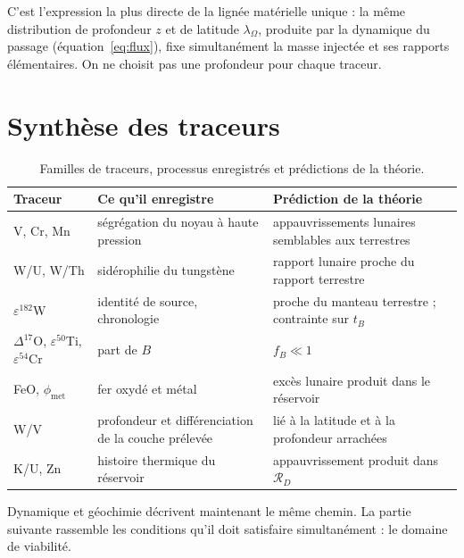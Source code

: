 \documentclass[11pt,a4paper,openany]{report}
\newcommand{\RD}{\mathcal{R}_{D}}
\begin{document}
\begin{ideephys}
C'est l'expression la plus directe de la lignée matérielle unique : la même distribution de
profondeur $z$ et de latitude $\lambda_\Omega$, produite par la dynamique du passage
(équation~\eqref{eq:flux}), fixe simultanément la masse injectée et ses rapports élémentaires. On ne
choisit pas une profondeur pour chaque traceur.
\end{ideephys}

\section{Synthèse des traceurs}

\begin{table}[htbp]
\centering
\small
\caption{Familles de traceurs, processus enregistrés et prédictions de la théorie.}
\label{tab:traceurs}
\begin{tabularx}{\textwidth}{>{\raggedright\arraybackslash}p{2.6cm}
>{\raggedright\arraybackslash}X >{\raggedright\arraybackslash}X}
\toprule
\textbf{Traceur} & \textbf{Ce qu'il enregistre} & \textbf{Prédiction de la théorie} \\
\midrule
V, Cr, Mn & ségrégation du noyau à haute pression & appauvrissements lunaires semblables aux terrestres \\
W/U, W/Th & sidérophilie du tungstène & rapport lunaire proche du rapport terrestre \\
$\varepsilon^{182}$W & identité de source, chronologie & proche du manteau terrestre ; contrainte sur $t_B$ \\
$\Delta^{17}$O, $\varepsilon^{50}$Ti, $\varepsilon^{54}$Cr & part de $B$ & $f_B\ll1$ \\
FeO, $\phi_{\mathrm{met}}$ & fer oxydé et métal & excès lunaire produit dans le réservoir \\
W/V & profondeur et différenciation de la couche prélevée & lié à la latitude et à la profondeur arrachées \\
K/U, Zn & histoire thermique du réservoir & appauvrissement produit dans $\RD$ \\
\bottomrule
\end{tabularx}
\end{table}

\begin{rappel}
Dynamique et géochimie décrivent maintenant le même chemin. La partie suivante rassemble les
conditions qu'il doit satisfaire simultanément : le domaine de viabilité.
\end{rappel}
\end{document}
